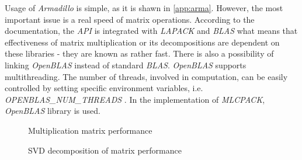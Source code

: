 Usage of \textit{Armadillo} is simple, as it is shawn in \cref{app:arma}. However, the most important issue is a real speed of matrix operations. According to the documentation, the \textit{API} is integrated with \textit{LAPACK} and \textit{BLAS} what means that effectiveness of matrix multiplication or its decompositions are dependent on these libraries - they are known as rather fast. There is also a possibility of linking \textit{OpenBLAS} instead of standard \textit{BLAS}. \textit{OpenBLAS} supports multithreading. The number of threads, involved in computation, can be easily controlled by setting specific environment variables, i.e. \textit{OPENBLAS\_NUM\_THREADS} \cite{Blas}. In the implementation of \textit{MLCPACK}, \textit{OpenBLAS} library is used.    

\begin{figure}[h]
\centering
\caption{Multiplication matrix performance}
\label{fig:mulperf}
\end{figure}

\begin{figure}
\centering
\caption{SVD decomposition of matrix performance}
\label{fig:svdperf}
\end{figure}


